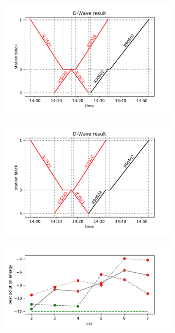 \begin{figure}
  \begin{subfigure}[b]{0.5\textwidth}
    \caption{}\label{fig:dwtd1}
    \includegraphics[width=\textwidth]{figures/small_DWave22_27_2000_2}
  \end{subfigure}
  \begin{subfigure}[b]{0.5\textwidth}
    \caption{}\label{fig:dwtd2}
    \includegraphics[width=\textwidth]{figures/small_DWave175_175_2000_2}
  \end{subfigure}
  \begin{subfigure}[b]{0.5\textwidth}
    \caption{}\label{fig:dwen1}
    \includegraphics[width=\textwidth]{figures/energy_small_22_27}

\end{subfigure}
\end{figure}
